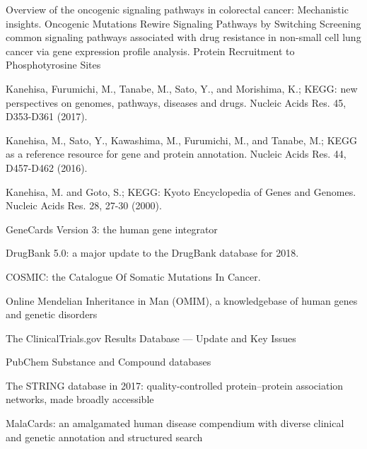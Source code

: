 















 
 Overview of the oncogenic signaling pathways in colorectal cancer: Mechanistic insights.
Oncogenic Mutations Rewire Signaling Pathways by Switching
 Screening common signaling pathways associated with drug resistance in non-small cell lung cancer via gene expression profile analysis. Protein Recruitment to Phosphotyrosine Sites





 Kanehisa, Furumichi, M., Tanabe, M., Sato, Y., and Morishima, K.; 
\newblock KEGG: new perspectives on genomes, pathways, diseases and drugs. 
\newblock Nucleic Acids Res. 45, D353-D361 (2017).

 Kanehisa, M., Sato, Y., Kawashima, M., Furumichi, M., and Tanabe, M.; 
\newblock KEGG as a reference resource for gene and protein annotation. 
\newblock Nucleic Acids Res. 44, D457-D462 (2016).

 Kanehisa, M. and Goto, S.; 
\newblock KEGG: Kyoto Encyclopedia of Genes and Genomes. 
\newblock Nucleic Acids Res. 28, 27-30 (2000).

GeneCards Version 3: the human gene integrator

 DrugBank 5.0: a major update to the DrugBank database for 2018.

 COSMIC: the Catalogue Of Somatic Mutations In Cancer.

 Online Mendelian Inheritance in Man (OMIM), a knowledgebase of human genes and genetic disorders

 The ClinicalTrials.gov Results Database — Update and Key Issues

 PubChem Substance and Compound databases

 The STRING database in 2017: quality-controlled protein–protein association networks, made broadly accessible

 MalaCards: an amalgamated human disease compendium with diverse clinical and genetic annotation and structured search
